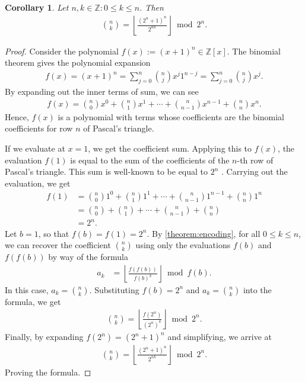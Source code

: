 \documentclass{article}
\theoremstyle{plain}
\newtheorem{corollary}[theorem]{Corollary}
\theoremstyle{definition}
\newcommand{\floor}[1]{\left\lfloor #1 \right\rfloor}
\begin{document}
\begin{corollary} \label{corollary:binomialcoefficients}
Let $n,k \in \mathbb{Z} : 0 \leq k \leq n$. Then
\begin{align*}
\binom{n}{k} = \floor{\frac{(2^n+1)^n}{2^{n k}}} \bmod{2^n} .
\end{align*}
\end{corollary}
\begin{proof}
Consider the polynomial $f(x) := (x+1)^n \in \mathbb{Z}[x]$. The binomial theorem gives the polynomial expansion
\begin{align*}
    f(x) = (x+1)^n = \sum_{j=0}^n \binom{n}{j} x^j 1^{n-j} = \sum_{j=0}^n \binom{n}{j} x^j .
\end{align*}
By expanding out the inner terms of sum, we can see
\begin{align*}
    f(x) = \binom{n}{0} x^0 + \binom{n}{1} x^1 + \cdots + \binom{n}{n-1} x^{n-1} + \binom{n}{n} x^{n} .
\end{align*}
Hence, $f(x)$ is a polynomial with terms whose coefficients are the binomial coefficients for row $n$ of Pascal's triangle. 

If we evaluate at $x=1$, we get the coefficient sum. Applying this to $f(x)$, the evaluation $f(1)$ is equal to the sum of the coefficients of the $n$-th row of Pascal's triangle. This sum is well-known to be equal to $2^n$ \cite{A000079}. Carrying out the evaluation, we get
\begin{align*}
f(1) &= \binom{n}{0} 1^0 + \binom{n}{1} 1^1 + \cdots + \binom{n}{n-1} 1^{n-1} + \binom{n}{n} 1^{n} \\
&= \binom{n}{0} + \binom{n}{1} + \cdots + \binom{n}{n-1} + \binom{n}{n} \\
&= 2^n .
\end{align*}
Let $b = 1$, so that $f(b) = f(1) = 2^n$. By \cref{theorem:encoding}, for all $0 \leq k \leq n$, we can recover the coefficient $\binom{n}{k}$ using only the evaluations $f(b)$ and $f(f(b))$ by way of the formula
\begin{align*}
    a_k &= \floor{\frac{f(f(b))}{f(b)^k}} \bmod{f(b)} .
\end{align*}
In this case, $a_k = \binom{n}{k}$. Substituting $f(b) = 2^n$ and $a_k = \binom{n}{k}$ into the formula, we get
\begin{align*}
    \binom{n}{k} = \floor{\frac{f(2^n)}{(2^n)^k}} \bmod{2^n} .
\end{align*}
Finally, by expanding $f(2^n) = (2^n+1)^n$ and simplifying, we arrive at
\begin{align*}
    \binom{n}{k} = \floor{\frac{(2^n+1)^n}{2^{nk}}} \bmod{2^n} .
\end{align*}
Proving the formula.
\end{proof}
\end{document}

